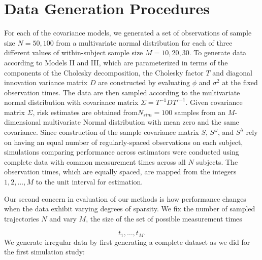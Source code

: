 \section{Data Generation Procedures}

For each of the covariance models, we generated a set of observations of sample size $N = 50, 100$ from a multivariate normal distribution for each of three different values of within-subject sample size $M = 10, 20, 30$. To generate data according to Models II and III, which are parameterized in terms of the components of the Cholesky decomposition, the Cholesky factor $T$ and diagonal innovation variance matrix $D$ are constructed by evaluating $\phi$ and $\sigma^2$ at the fixed observation times. The data are then sampled according to the multivariate normal distribution with covariance matrix $\Sigma = T^{-1} D {T'}^{-1}$. Given covariance matrix $\Sigma$, risk estimates are obtained from$N_{sim} = 100$ samples from an $M$-dimensional multivariate Normal distribution with mean zero and the same covariance.  Since construction of the sample covariance matrix $S$, $S^\omega$, and $S^\lambda$ rely on having an equal number of regularly-spaced observations on each subject, simulations comparing performance across estimators were conducted using complete data with common measurement times across all $N$ subjects. The observation times, which are equally spaced, are mapped from the integers $1,2, \dots, M$ to the unit interval for estimation.

\bigskip

Our second concern in evaluation of our methods is how performance changes when the data exhibit varying degrees of sparsity. We fix the number of sampled trajectories $N$ and vary $M$, the size of the set  of possible measurement times

\[
t_1,\dots, t_M.
\]
\noindent
We generate irregular data by first generating a complete dataset as we did for the first simulation study:

